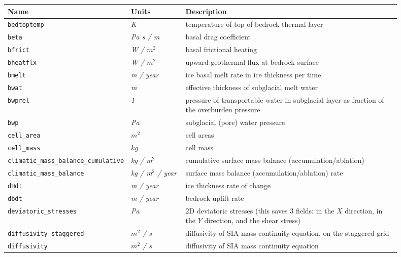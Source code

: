 \begin{table}[ht]
  \centering
  \begin{tabular}{p{0.15\linewidth}p{0.15\linewidth}p{0.6\linewidth}}
    \toprule
    \textbf{Name} & \textbf{Units} & \textbf{Description} \\
    \midrule
    \texttt{bedtoptemp} & \textsl{K} & temperature of top of bedrock thermal layer \\
    \texttt{beta} & \textsl{Pa s / m} & basal drag coefficient\\
    \texttt{bfrict} & \textsl{W  / $m^2$} &  basal frictional heating \\
    \texttt{bheatflx} & \textsl{W  / $m^2$} & upward geothermal flux at bedrock surface \\
    \texttt{bmelt} & \textsl{m / year} & ice basal melt rate in ice thickness per time \\
    \texttt{bwat} & \textsl{m} & effective thickness of subglacial melt water \\
    \texttt{bwprel} & \textsl{1} & pressure of transportable water in subglacial layer as fraction of the overburden pressure\\
    \texttt{bwp} & \textsl{Pa} & subglacial (pore) water pressure \\
    \texttt{cell_area} & \textsl{$m^{2}$} & cell areas \\
    \texttt{cell_mass} & \textsl{$kg$} & cell mass \\
    \texttt{climatic_mass_balance_cumulative} & \textsl{kg / m$^2$} & cumulative surface mass balance (accumulation/ablation) \\
    \texttt{climatic_mass_balance} & \textsl{kg / m$^2$ / year} & surface mass balance (accumulation/ablation) rate \\
    \texttt{dHdt} & \textsl{m / year} &  ice thickness rate of change \\
    \texttt{dbdt} & \textsl{m / year} & bedrock uplift rate \\
    \texttt{deviatoric_stresses} & \textsl{Pa} & 2D deviatoric stresses (this saves 3 fields: in the $X$ direction, in the $Y$ direction, and the shear stress) \\
    \texttt{diffusivity_staggered} & \textsl{$m^{2}$  / s} &  diffusivity of SIA mass continuity equation, on the staggered grid \\
    \texttt{diffusivity} & \textsl{$m^{2}$  / s} &  diffusivity of SIA mass continuity equation \\

\end{tabular}
\end{table}
